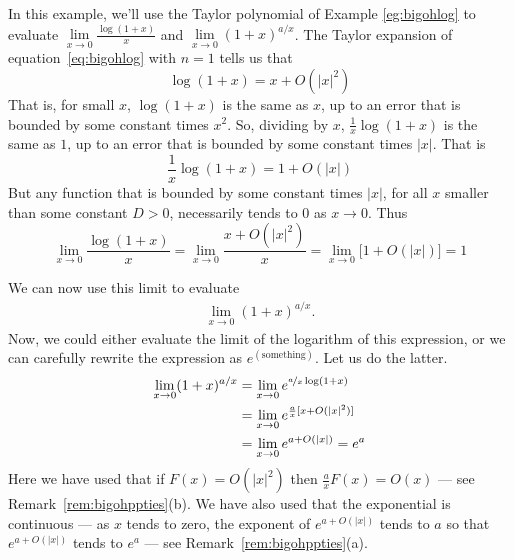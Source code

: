 \begin{eg}\label{eg:bigohlimitA}
In this example, we'll use the Taylor polynomial of Example \ref{eg:bigohlog}
to evaluate $\lim\limits_{x\rightarrow 0}\tfrac{\log(1+x)}{x}$ and
$\lim\limits_{x\rightarrow 0}(1+x)^{a/x}$.
The Taylor expansion of equation~\eqref{eq:bigohlog} with $n=1$ tells us that
$$
\log(1+x)=x+O(|x|^2)
$$
That is, for small $x$, $\log(1+x)$ is the same as $x$, up to an error that
is bounded by some constant times $x^2$.
So, dividing by $x$, $\frac{1}{x}\log(1+x)$ is the same as $1$, up to an
error that is bounded by some constant times $|x|$.
That is
\begin{equation*}
\frac{1}{x}\log(1+x)=1+O(|x|)
\end{equation*}
But any function that is bounded by some constant times $|x|$,
for all $x$ smaller than some constant $D>0$, necessarily tends to $0$
as $x\rightarrow 0$. Thus
\begin{equation*}
\lim_{x\rightarrow 0}\frac{\log(1+x)}{x}
=\lim_{x\rightarrow 0}\frac{x+O(|x|^2)}{x}
=\lim_{x\rightarrow 0}\big[1+O(|x|)\big]
=1
\end{equation*}

We can now use this limit to evaluate
\begin{align*}
\lim_{x\rightarrow 0}(1+x)^{a/x}.
\end{align*}
Now, we could either evaluate the limit of the logarithm of this
expression, or we can carefully rewrite the expression
as $e^\mathrm{(something)}$. Let us do the latter.
\begin{align*}
\lim_{x\rightarrow 0}(1+x)^{a/x}
&=\lim_{x\rightarrow 0}e^{\nicefrac{a}{x} \log(1+x) }\\
&=\lim_{x\rightarrow 0}e^{\frac{a}{x}[x+O(|x|^2)]}\\
&=\lim_{x\rightarrow 0}e^{a+O(|x|)}
=e^a
\end{align*}
Here we have used that if $F(x)=O(|x|^2)$ then $\frac{a}{x} F(x) = O(x)$ --- see Remark~\ref{rem:bigohppties}(b).
We have also used that the exponential is continuous --- as $x$
tends to zero, the exponent of $e^{a+O(|x|)}$ tends to $a$
so that $e^{a+O(|x|)}$ tends to $e^a$ --- see Remark~\ref{rem:bigohppties}(a).
\end{eg}

